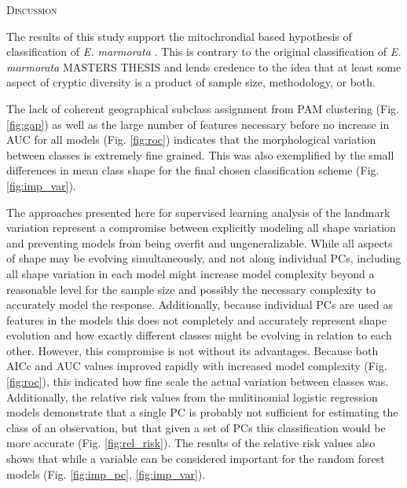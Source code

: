 \documentclass[12pt,letterpaper]{article}\usepackage{graphicx, color}
\renewcommand{\section}[1]{%
\bigskip
\begin{center}
\begin{Large}
\normalfont\scshape #1
\medskip
\end{Large}
\end{center}}
\begin{document}
\section{Discussion}
The results of this study support the mitochrondial based hypothesis of classification of \textit{E. marmorata} \citep{Spinks2005,Spinks2010}. This is contrary to the original classification of \textit{E. marmorata} \citep{Seeliger1945} MASTERS THESIS and lends credence to the idea that at least some aspect of cryptic diversity is a product of sample size, methodology, or both.


The lack of coherent geographical subclass assignment from PAM clustering (Fig. \ref{fig:gap}) as well as the large number of features necessary before no increase in AUC for all models (Fig. \ref{fig:roc}) indicates that the morphological variation between classes is extremely fine grained. This was also exemplified by the small differences in mean class shape for the final chosen classification scheme (Fig. \ref{fig:imp_var}).

The approaches presented here for supervised learning analysis of the landmark variation represent a compromise between explicitly modeling all shape variation and preventing models from being overfit and ungeneralizable. While all aspects of shape may be evolving simultaneously, and not along individual PCs, including all shape variation in each model might increase model complexity beyond a reasonable level for the sample size and possibly the necessary complexity to accurately model the response. Additionally, because individual PCs are used as features in the models this does not completely and accurately represent shape evolution and how exactly different classes might be evolving in relation to each other. However, this compromise is not without its advantages. Because both AICc and AUC values improved rapidly with increased model complexity (Fig. \ref{fig:roc}), this indicated how fine scale the actual variation between classes was. Additionally, the relative risk values from the mulitinomial logistic regression models demonstrate that a single PC is probably not sufficient for estimating the class of an observation, but that given a set of PCs this classification would be more accurate (Fig. \ref{fig:rel_risk}). The results of the relative risk values also shows that while a variable can be considered important for the random forest models (Fig. \ref{fig:imp_pc}, \ref{fig:imp_var}).
\end{document}
